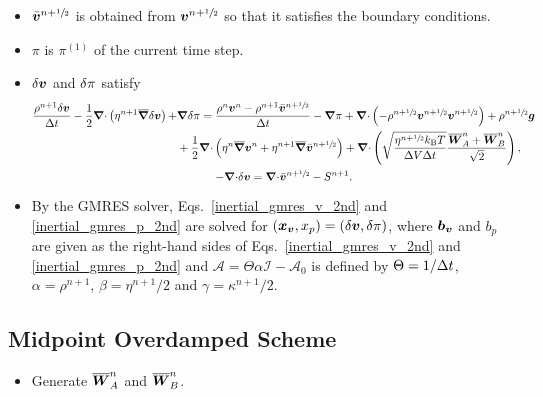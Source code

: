 \documentclass[
10pt
showpacs, showkeys,
amsmath,amssymb,
aps,
pre,
floatfix,
]{revtex4-1}
\newcommand{\divg}{{\V\nabla\cdot}}                       %
\newcommand{\paren}[1]{{(#1)}}                            %
\begin{document}
\begin{enumerate}
\begin{itemize}
\item $\bar{\boldsymbol{v}}^{n+\sfrac{1}{2}}$ is obtained from $\boldsymbol{v}^{n+\sfrac{1}{2}}$ so that it satisfies the boundary conditions.
\item $\pi$ is $\pi^\paren{1}$ of the current time step.
\item $\delta\boldsymbol{v}$ and $\delta\pi$ satisfy
\begin{gather}
\label{inertial_gmres_v_2nd}
\begin{split}
\frac{\rho^{n+1}\d{\V{v}}}{\D{t}} - \frac{1}{2}\divg\left(\eta^{n+1}\overline{\grad}\d{\V{v}}\right) + & \grad\d{\pi}
= \frac{\rho^n\V{v}^n-\rho^{n+1}\bar{\V{v}}^{n+\myhalf}}{\D{t}} - \grad\pi 
+ \divg\left(-\rho^{n+\myhalf}\V{v}^{n+\myhalf}\V{v}^{n+\myhalf}\right) + \rho^{n+\myhalf}\V{g} \\
& + \frac{1}{2}\divg\left( \eta^n \overline{\grad}\V{v}^n + \eta^{n+1} \overline{\grad}\bar{\V{v}}^{n+\myhalf} \right)
+ \divg\left( \sqrt{\frac{\eta^{n+\myhalf} k_\mathrm{B}T}{\D{V}\D{t}} } \frac{\overline{\V{W}}^n_A + \overline{\V{W}}^n_B}{\sqrt{2}} \right),
\end{split} \\
\label{inertial_gmres_p_2nd}
-\divg\d{\V{v}} = \divg\bar{\V{v}}^{n+\myhalf}-S^{n+1}.
\end{gather}
\item By the GMRES solver, Eqs.~\eqref{inertial_gmres_v_2nd} and \eqref{inertial_gmres_p_2nd} are solved for $(\boldsymbol{x}_{\boldsymbol{v}},x_p)=(\delta\boldsymbol{v},\delta\pi)$, where $\boldsymbol{b}_{\boldsymbol{v}}$ and $b_p$ are given as the right-hand sides of Eqs.~\eqref{inertial_gmres_v_2nd} and \eqref{inertial_gmres_p_2nd} and $\mathcal{A}=\Theta\alpha\mathcal{I}-\mathcal{A}_0$ is defined by $\Theta=1/\Delta t$, $\alpha=\rho^{n+1}$, $\beta=\eta^{n+1}/2$ and $\gamma=\kappa^{n+1}/2$.
\end{itemize}

\end{enumerate}



\clearpage



\subsection{Midpoint Overdamped Scheme}

\begin{itemize}
\item Generate $\overline{\boldsymbol{W}}^n_A$ and $\overline{\boldsymbol{W}}^n_B$.
\end{itemize}
\end{document}
